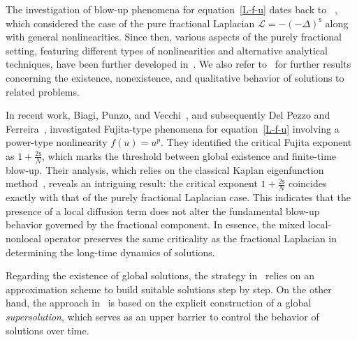 \documentclass[12pt,reqno]{amsart}
\theoremstyle{plain}
\theoremstyle{definition}
\theoremstyle{remark}
\numberwithin{equation}{section}
\newcommand{\sL}{\mathscr{L}}
\newcommand{\ts}{\mathsf{s}}
\begin{document}
The investigation of blow-up phenomena for equation~\eqref{L-f-u} dates back to ~\cite{Sugitani}, which considered the case of the pure fractional Laplacian $\sL = -(-\Delta)^\ts$ along with general nonlinearities. Since then, various aspects of the purely fractional setting, featuring different types of nonlinearities and alternative analytical techniques, have been further developed in~\cite{Fino, Kirane1, Kirane2}. We also refer to~\cite{Y, X} for further results concerning the existence, nonexistence, and qualitative behavior of solutions to related problems.

In recent work, Biagi, Punzo, and Vecchi~\cite{biagi2024}, and subsequently Del Pezzo and Ferreira~\cite{Fuj2025}, investigated Fujita-type phenomena for equation~\eqref{L-f-u} involving a power-type nonlinearity  $ f(u) = u^p $. They identified the critical Fujita exponent as $ 1 + \frac{2\ts}{N} $, which marks the threshold between global existence and finite-time blow-up. Their analysis, which relies on the classical Kaplan eigenfunction method~\cite{Kaplan}, reveals an intriguing result: the critical exponent $ 1 + \frac{2\ts}{N} $ coincides exactly with that of the purely fractional Laplacian case. This indicates that the presence of a local diffusion term does not alter the fundamental blow-up behavior governed by the fractional component. In essence, the mixed local-nonlocal operator preserves the same criticality as the fractional Laplacian in determining the long-time dynamics of solutions.

Regarding the existence of global solutions, the strategy in~\cite{biagi2024} relies on an approximation scheme to build suitable solutions step by step. On the other hand, the approach in~\cite{Fuj2025} is based on the explicit construction of a global \emph{supersolution}, which serves as an upper barrier to control the behavior of solutions over time.
\end{document}
